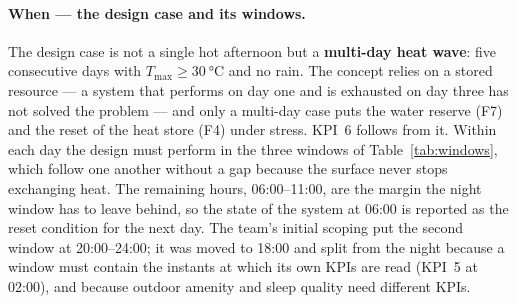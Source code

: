 \paragraph{When --- the design case and its windows.} The design case is not a
single hot afternoon but a \textbf{multi-day heat wave}: five consecutive days
with $T_\mathrm{max} \geq \qty{30}{\celsius}$ and no rain. The concept relies on
a stored resource --- a system that performs on day one and is exhausted on day
three has not solved the problem --- and only a multi-day case puts the water
reserve (F7) and the reset of the heat store (F4) under stress. KPI~6 follows
from it.  Within each day the design must
perform in the three windows of Table~\ref{tab:windows}, which follow one
another without a gap because the surface never stops exchanging heat. The
remaining hours, 06:00--11:00, are the margin the night window has to leave
behind, so the state of the system at 06:00 is reported as the reset condition
for the next day. The team's initial scoping put the second window at
20:00--24:00; it was moved to 18:00 and split from the night because a window
must contain the instants at which its own KPIs are read (KPI~5 at 02:00), and
because outdoor amenity and sleep quality need different KPIs.

